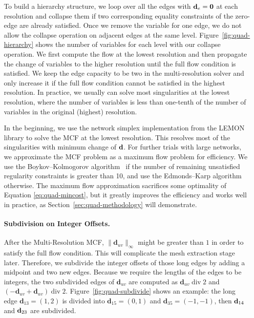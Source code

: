 To build a hierarchy structure, we loop over all the edges with ${\mathbf{d}}_e=\textbf{0}$ at each resolution and collapse them if two corresponding equality constraints of the zero-edge are already satisfied. Once we remove the variable for one edge, we do not allow the collapse operation on adjacent edges at the same level. Figure~\ref{fig:quad-hierarchy} shows the number of variables for each level with our collapse operation. We first compute the flow at the lowest resolution and then propagate the change of variables to the higher resolution until the full flow condition is satisfied.  We keep the edge capacity to be two in the multi-resolution solver and only increase it if the full flow condition cannot be satisfied in the highest resolution. In practice, we usually can solve most singularities at the lowest resolution, where the number of variables is less than one-tenth of the number of variables in the original (highest) resolution.  

In the beginning, we use the network simplex implementation from the LEMON library \cite{dezsHo2011lemon} to solve the MCF at the lowest resolution.  This resolves most of the singularities with minimum change of ${\mathbf{d}}$.  For further trials with large networks, we approximate the MCF problem as a maximum flow problem for efficiency.  We use the Boykov--Kolmogorov algorithm~\cite{boykov2004experimental} if the number of remaining unsatisfied regularity constraints is greater than 10, and use the Edmonds--Karp algorithm~\cite{edmonds1972theoretical} otherwise.  The maximum flow approximation sacrifices some optimality of Equation \eqref{eq:quad-mincost}, but it greatly improves the efficiency and works well in practice, as Section~\ref{sec:quad-methodology} will demonstrate.

\paragraph*{Subdivision on Integer Offsets.}
After the Multi-Resolution MCF, $\|{\textbf{d}}_{uv}\|_{\infty}$ might be greater than $1$ in order to satisfy the full flow condition.  This will complicate the mesh extraction stage later. Therefore, we subdivide the integer offsets of those long edges by adding a midpoint and two new edges. Because we require the lengths of the edges to be integers, the two subdivided edges of ${\textbf{d}}_{uv}$ are computed as ${\textbf{d}}_{uv}\;\text{div}\;2$ and $(-{\textbf{d}}_{uv}+{\textbf{d}}_{uv})\;\text{div}\;2$. Figure~\ref{fig:quad-subdivide} shows an example: the long edge ${\textbf{d}}_{13}=(1,2)$ is divided into ${\textbf{d}}_{15}=(0,1)$ and ${\textbf{d}}_{35}=(-1,-1)$, then ${\mathbf{d}}_{14}$ and ${\mathbf{d}}_{23}$ are subdivided.


